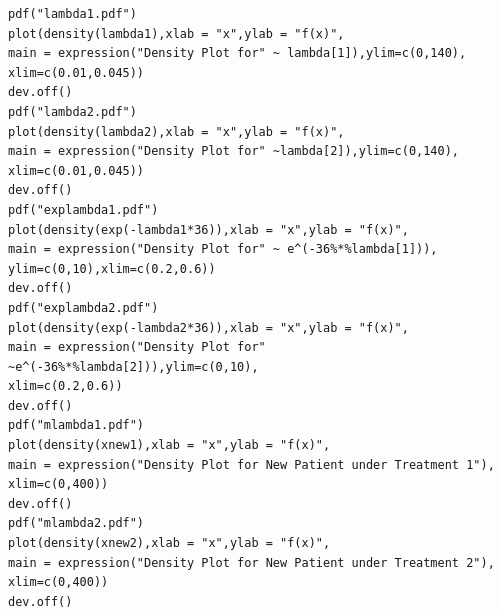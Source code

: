 \documentclass[12pt, leqno]{article}
\begin{document}
\begin{verbatim}
pdf("lambda1.pdf")
plot(density(lambda1),xlab = "x",ylab = "f(x)",
main = expression("Density Plot for" ~ lambda[1]),ylim=c(0,140),
xlim=c(0.01,0.045))
dev.off()
pdf("lambda2.pdf")
plot(density(lambda2),xlab = "x",ylab = "f(x)", 
main = expression("Density Plot for" ~lambda[2]),ylim=c(0,140),
xlim=c(0.01,0.045))
dev.off()
pdf("explambda1.pdf")
plot(density(exp(-lambda1*36)),xlab = "x",ylab = "f(x)",
main = expression("Density Plot for" ~ e^(-36%*%lambda[1])),
ylim=c(0,10),xlim=c(0.2,0.6))
dev.off()
pdf("explambda2.pdf")
plot(density(exp(-lambda2*36)),xlab = "x",ylab = "f(x)",
main = expression("Density Plot for"
~e^(-36%*%lambda[2])),ylim=c(0,10),
xlim=c(0.2,0.6))
dev.off()
pdf("mlambda1.pdf")
plot(density(xnew1),xlab = "x",ylab = "f(x)",
main = expression("Density Plot for New Patient under Treatment 1"),
xlim=c(0,400))
dev.off()
pdf("mlambda2.pdf")
plot(density(xnew2),xlab = "x",ylab = "f(x)",
main = expression("Density Plot for New Patient under Treatment 2"),
xlim=c(0,400))
dev.off()

\end{verbatim}
\end{document}
